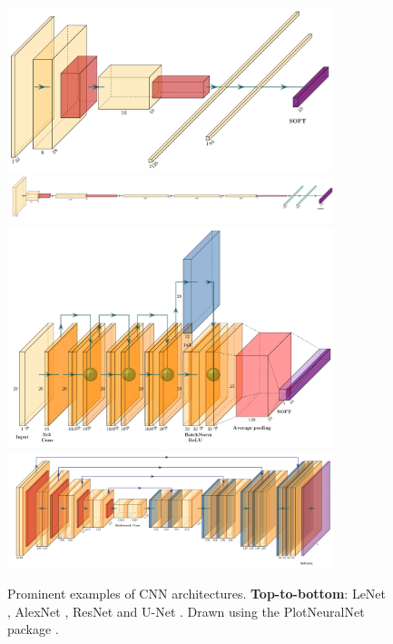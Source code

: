 \begin{figure}
    \centering
    \includegraphics[width=0.85\textwidth]{figures/lenet.pdf}
    \includegraphics[width=0.85\textwidth]{figures/alexnet.pdf}
    \includegraphics[width=0.85\textwidth]{figures/resnet.pdf}
    \includegraphics[width=0.85\textwidth]{figures/Unet.pdf}
    \caption{Prominent examples of CNN architectures. \textbf{Top-to-bottom}: LeNet \citep{lecun1998gradient}, AlexNet \citep{krizhevsky2012imagenet}, ResNet \citep{he2016deep} and U-Net \citep{ronneberger2015u}. Drawn using the PlotNeuralNet package \citep{haris2018}.}
    \label{fig:cnn_drawn_plot}
\end{figure}
